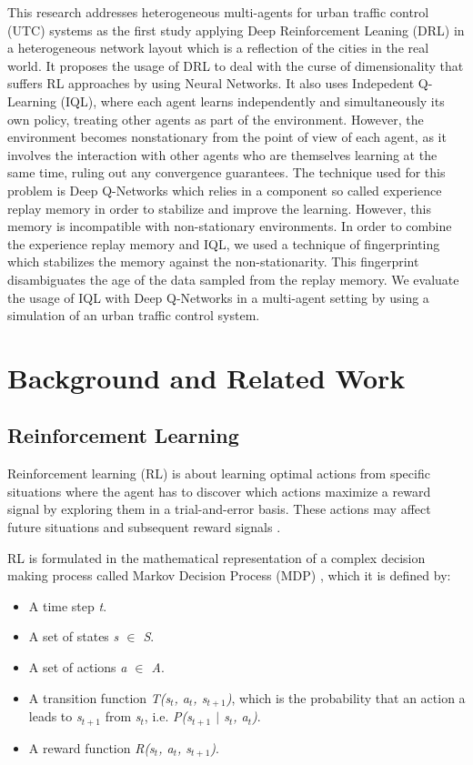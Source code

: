 \documentclass{llncs}
\begin{document}
This research addresses heterogeneous multi-agents for  urban traffic control (UTC) systems as the first study applying Deep Reinforcement Leaning (DRL) in a heterogeneous network layout which is a reflection of the cities in the real world. It proposes the usage of DRL to deal with the curse of dimensionality that suffers RL approaches by using Neural Networks. It also uses Indepedent Q-Learning (IQL), where each agent learns independently and simultaneously its own policy, treating other agents as part of the environment. However, the environment becomes nonstationary from the point of view of each agent, as it involves the interaction with other agents who are themselves learning at the same time, ruling out any convergence guarantees. The technique used for this problem is Deep Q-Networks which relies in a component so called experience replay memory in order to stabilize and improve the learning. However, this memory is incompatible with non-stationary environments. In order to combine the experience replay memory and IQL, we used a technique of fingerprinting which stabilizes the memory against the non-stationarity. This fingerprint disambiguates the age of the data sampled from the replay memory. We evaluate the usage of IQL with Deep Q-Networks in a multi-agent setting by using a simulation of an urban traffic control system.


\section{Background and Related Work}

\subsection{Reinforcement Learning}

Reinforcement learning (RL) is about learning optimal actions from specific situations where the agent has to discover which actions maximize a reward signal by exploring them in a trial-and-error basis. These actions may affect future situations and subsequent reward signals \cite{RichardS.SuttonandAndrewG.Barto2018}.
	
	RL is formulated in the mathematical representation of a complex decision making process called Markov Decision Process (MDP) \cite{Puterman:1994:MDP:528623}, which it is defined by:

\begin{itemize}
  \item A time step \textit{t}.
  \item A set of states \textit{s $\in$ S}.
  \item A set of actions \textit{a $\in$ A}.
  \item A transition function \textit{T(s$_{t}$, a$_{t}$, s$_{t+1}$)}, which is the probability that an action a leads to \textit{s$_{t+1}$} from \textit{s$_{t}$}, i.e.\textit{ P(s$_{t+1}$ $|$ s$_{t}$, a$_{t}$)}.
\item A reward function\textit{ R(s$_{t}$, a$_{t}$, s$_{t+1}$)}.
\end{itemize}
\end{document}
